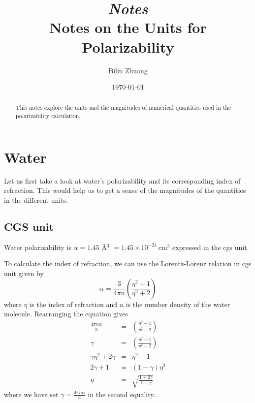 \documentclass[aps, 12pt, amsmath, amssymb, onecolumn, notitlepage, nofootinbib]{revtex4-1}
\begin{document}

\title{{\small\it{Notes}}\\ Notes on the Units for Polarizability }
\author{Bilin Zhuang}
\date{\today}



\begin{abstract}

This notes explore the units and the magnitudes of numerical quantities used in the polarizability calculation.
	
\end{abstract}

\maketitle

\section{Water}

Let us first take a look at water's polarizability and its corresponding index of refraction. This would help us to get a sense of the magnitudes of the quantities in the different units.

\subsection{CGS unit}

 Water polarizability is $\alpha = 1.45$ \AA$^3$ $= 1.45 \times 10^{-24}\ \text{cm}^3$ expressed in the cgs unit.

 To calculate the index of refraction, we can use the Lorentz-Lorenz relation in cgs unit given by
\begin{equation}
\alpha = \frac{3}{4\pi n} \left( \frac{\eta^2 - 1 }{\eta^2 +2} \right)
\end{equation}
where $\eta$ is the index of refraction and $n$ is the number density of the water molecule. Rearranging the equation gives
\begin{eqnarray}
\frac{4\pi n\alpha}{3} &=&   \left( \frac{\eta^2 - 1 }{\eta^2 +2} \right) \nonumber\\
\gamma &=&   \left( \frac{\eta^2 - 1 }{\eta^2 +2} \right) \nonumber\\
\gamma\eta^2 +2\gamma &=&  \eta^2 - 1\nonumber\\
2\gamma + 1 &=&  (1-\gamma) \eta^2\nonumber\\ 
\eta &=&  \sqrt{\frac{1 + 2\gamma}{1-\gamma}}
\label{refracIndex}
\end{eqnarray}
where we have set $\gamma = \frac{4\pi n\alpha}{3}$ in the second equality. 
\end{document}
